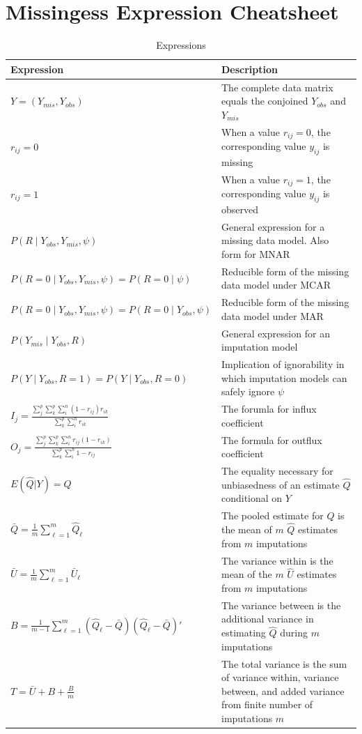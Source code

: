 \documentclass[12pt,oneside]{chicagocapstone}
\begin{document}
\chapter{Missingess Expression
Cheatsheet}\label{missingess-expression-cheatsheet}
\begin{table}[!h]

\caption{\label{tab:appendixcexpressions}Expressions}
\begin{tabu} to 
\toprule
\begingroup\fontsize{13}{15}\selectfont \textbf{Expression}\endgroup & \begingroup\fontsize{13}{15}\selectfont \textbf{Description}\endgroup\\
\midrule
$Y = (Y_{mis}, Y_{obs})$ & The complete data matrix equals the conjoined $Y_{obs}$ and $Y_{mis}$\\
$r_{ij} = 0$ & When a value $r_{ij}=0$, the corresponding value $y_{ij}$ is missing\\
$r_{ij} = 1$ & When a value $r_{ij}=1$, the corresponding value $y_{ij}$ is observed\\
$P(R\mid Y_{obs}, Y_{mis},\psi)$ & General expression for a missing data model. Also form for MNAR\\
$P(R=0\mid Y_{obs},Y_{mis},\psi) = P(R=0\mid \psi)$ & Reducible form of the missing data model under MCAR\\
\addlinespace
$P(R=0\mid Y_{obs},Y_{mis},\psi) = P(R=0\mid Y_{obs}, \psi)$ & Reducible form of the missing data model under MAR\\
$P(Y_{mis}\mid Y_{obs}, R)$ & General expression for an imputation model\\
$P(Y\mid Y_{obs}, R=1) = P(Y\mid Y_{obs}, R=0)$ & Implication of ignorability in which imputation models can safely ignore $\psi$\\
$I_j = \frac{\sum_j^p\sum_k^p\sum_i^n (1-r_{ij})r_{ik}}{\sum_k^p\sum_i^n r_{ik}}$ & The forumla for influx coefficient\\
$O_j = \frac{\sum_j^p\sum_k^p\sum_i^n r_{ij}(1-r_{ik})}{\sum_k^p\sum_i^n 1-r_{ij}}$ & The formula for outflux coefficient\\
\addlinespace
$E(\hat Q|Y) = Q$ & The equality necessary for unbiasedness of an estimate $\hat Q$ conditional on $Y$\\
$\bar Q = \frac{1}{m}\sum_{\ell=1}^m \hat Q_\ell$ & The pooled estimate for $Q$ is the mean of $m$ $\hat Q$ estimates from $m$ imputations\\
$\bar U = \frac{1}{m}\sum_{\ell=1}^m \bar U_\ell$ & The variance within is the mean of the $m$ $\hat U$ estimates from $m$ imputations\\
$B = \frac{1}{m-1}\sum_{\ell=1}^m (\hat Q_\ell-\bar Q)(\hat Q_\ell-\bar Q)'$ & The variance between is the additional variance in estimating $\hat Q$ during $m$ imputations\\
$T = \bar U + B + \frac{B}{m}$ & The total variance is the sum of variance within, variance between, and added variance from finite number of imputations $m$\\
\bottomrule
\end{tabu}
\end{table}
\end{document}
